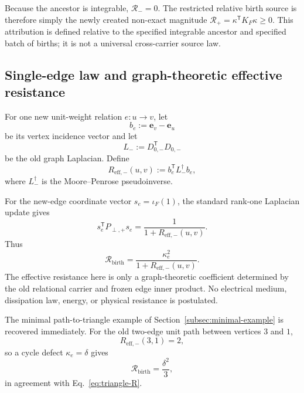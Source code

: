 \documentclass[aip,jmp,amsmath,amssymb,reprint]{revtex4-2}
\newcommand{\Rcal}{\mathcal{R}}
\begin{document}
Because the ancestor is integrable, $\Rcal_-=0$. The restricted relative birth source is therefore simply the newly created non-exact magnitude $\Rcal_+=\kappa^{\mathsf T}K_F\kappa\ge0$. This attribution is defined relative to the specified integrable ancestor and specified batch of births; it is not a universal cross-carrier source law.

\subsection{Single-edge law and graph-theoretic effective resistance}

For one new unit-weight relation $e:u\to v$, let
\begin{equation}
b_e:=\mathbf e_v-\mathbf e_u
\end{equation}
be its vertex incidence vector and let
\begin{equation}
L_-:=D_{0,-}^{\mathsf T}D_{0,-}
\end{equation}
be the old graph Laplacian. Define
\begin{equation}
R_{\mathrm{eff},-}(u,v)
:=b_e^{\mathsf T}L_-^{\dagger}b_e,
\label{eq:Reff-definition}
\end{equation}
where $L_-^{\dagger}$ is the Moore--Penrose pseudoinverse.

For the new-edge coordinate vector $s_e=\iota_F(1)$, the standard rank-one Laplacian update gives
\begin{equation}
s_e^{\mathsf T}P_{\perp,+}s_e
=\frac{1}{1+R_{\mathrm{eff},-}(u,v)}.
\end{equation}
Thus
\begin{equation}
\boxed{
\Rcal_{\mathrm{birth}}
=\frac{\kappa_e^2}{1+R_{\mathrm{eff},-}(u,v)}.
}
\label{eq:single-edge-law}
\end{equation}
The effective resistance here is only a graph-theoretic coefficient determined by the old relational carrier and frozen edge inner product. No electrical medium, dissipation law, energy, or physical resistance is postulated.

The minimal path-to-triangle example of Section~\ref{subsec:minimal-example} is recovered immediately. For the old two-edge unit path between vertices $3$ and $1$,
\begin{equation}
R_{\mathrm{eff},-}(3,1)=2,
\end{equation}
so a cycle defect $\kappa_e=\delta$ gives
\begin{equation}
\Rcal_{\mathrm{birth}}=\frac{\delta^2}{3},
\end{equation}
in agreement with Eq.~\eqref{eq:triangle-R}.
\end{document}
